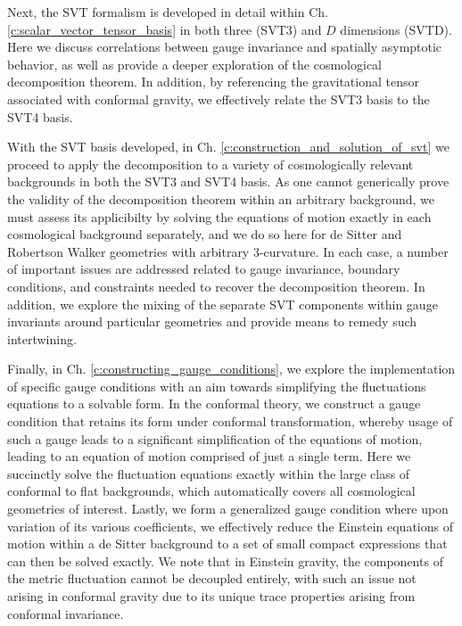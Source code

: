Next, the SVT formalism is developed in detail within Ch. \ref{c:scalar_vector_tensor_basis} in both three (SVT3) and $D$ dimensions (SVTD). Here we discuss correlations between gauge invariance and spatially asymptotic behavior, as well as provide a deeper exploration of the cosmological decomposition theorem. In addition, by referencing the gravitational tensor associated with conformal gravity, we effectively relate the SVT3 basis to the SVT4 basis.

With the SVT basis developed, in Ch. \ref{c:construction_and_solution_of_svt} we proceed to apply the decomposition to a variety of cosmologically relevant backgrounds in both the SVT3 and SVT4 basis. As one cannot generically prove the validity of the decomposition theorem within an arbitrary background, we must assess its applicibilty by solving the equations of motion exactly in each cosmological background separately, and we do so here for de Sitter and Robertson Walker geometries with arbitrary 3-curvature. In each case, a number of important issues are addressed related to gauge invariance, boundary conditions, and constraints needed to recover the decomposition theorem. In addition, we explore the mixing of the separate SVT components within gauge invariants around particular geometries and provide means to remedy such intertwining. 

Finally, in Ch. \ref{c:constructing_gauge_conditions}, we explore the implementation of specific gauge conditions with an aim towards simplifying the fluctuations equations to a solvable form. In the conformal theory, we construct a gauge condition that retains its form under conformal transformation, whereby usage of such a gauge leads to a significant simplification of the equations of motion, leading to an equation of motion comprised of just a single term. Here we succinctly solve the fluctuation equations exactly within the large class of conformal to flat backgrounds, which automatically covers all cosmological geometries of interest. Lastly, we form a generalized gauge condition where upon variation of its various coefficients, we effectively reduce the Einstein equations of motion within a de Sitter background to a set of small compact expressions that can then be solved exactly. We note that in Einstein gravity, the components of the metric fluctuation cannot be decoupled entirely, with such an issue not arising in conformal gravity due to its unique trace properties arising from conformal invariance.
 
